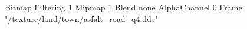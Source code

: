 {Bitmap
	{Filtering 1}
	{Mipmap 1}
	{Blend none}
	{AlphaChannel 0}
	{Frame "/texture/land/town/asfalt_road_q4.dds"}
}
